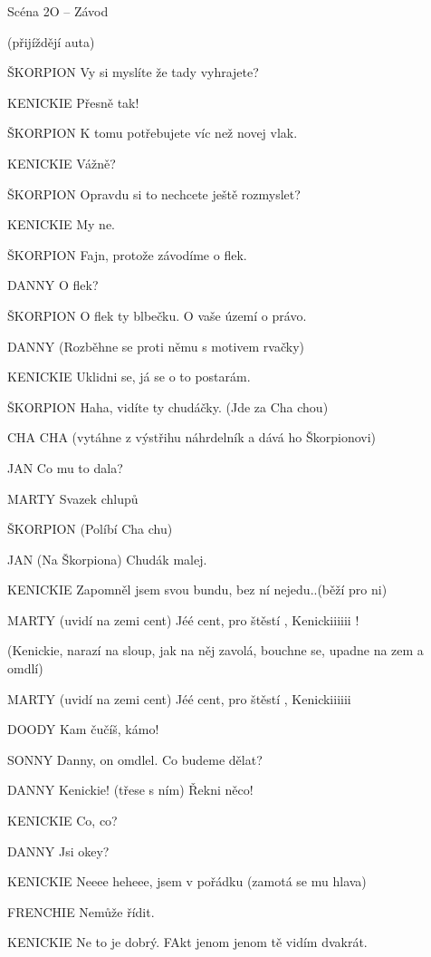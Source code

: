 Scéna 2O  – Závod 

(přijíždějí auta) 

ŠKORPION        Vy si myslíte že tady vyhrajete?

KENICKIE        Přesně tak! 

ŠKORPION        K tomu potřebujete víc než novej vlak. 

KENICKIE        Vážně?

ŠKORPION        Opravdu si to nechcete ještě rozmyslet?

KENICKIE        My ne.

ŠKORPION        Fajn, protože závodíme o flek. 

DANNY        O flek? 

ŠKORPION        O flek ty blbečku. O vaše území o právo. 

DANNY        (Rozběhne se proti němu s motivem rvačky) 

KENICKIE        Uklidni se, já se o to postarám. 

ŠKORPION        Haha, vidíte ty chudáčky. (Jde za Cha chou) 

CHA CHA        (vytáhne z výstřihu náhrdelník a dává ho Škorpionovi)

JAN        Co mu to dala?

MARTY        Svazek chlupů

ŠKORPION        (Políbí Cha chu)

JAN        (Na Škorpiona) Chudák malej. 

KENICKIE            Zapomněl jsem svou bundu, bez ní nejedu..(běží pro ni)

MARTY (uvidí na zemi cent)  Jéé cent,  pro štěstí , Kenickiiiiii !

(Kenickie, narazí na sloup, jak na něj zavolá, bouchne se, upadne na zem a omdlí)

MARTY (uvidí na zemi cent)  Jéé cent,  pro štěstí , Kenickiiiiii

DOODY        Kam čučíš, kámo!

SONNY        Danny,  on omdlel. Co budeme dělat? 

DANNY        Kenickie! (třese s ním) Řekni něco!

KENICKIE         Co, co? 

DANNY        Jsi okey? 

KENICKIE        Neeee heheee, jsem v pořádku (zamotá se mu hlava) 

FRENCHIE        Nemůže řídit. 

KENICKIE         Ne to je dobrý. FAkt jenom jenom tě vidím dvakrát. 

